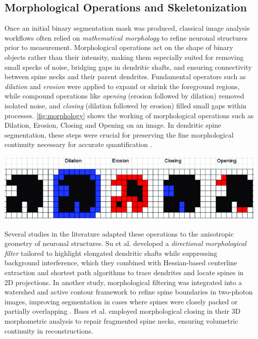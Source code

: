 \subsection{Morphological Operations and Skeletonization}
Once an initial binary segmentation mask was produced, classical image analysis workflows often relied on \textit{mathematical morphology} to refine neuronal structures prior to measurement. Morphological operations act on the shape of binary objects rather than their intensity, making them especially suited for removing small specks of noise, bridging gaps in dendritic shafts, and ensuring connectivity between spine necks and their parent dendrites. Fundamental operators such as \textit{dilation} and \textit{erosion} were applied to expand or shrink the foreground regions, while compound operations like \textit{opening} (erosion followed by dilation) removed isolated noise, and \textit{closing} (dilation followed by erosion) filled small gaps within processes. \autoref{fig:morphology} shows the working of morphological operations such as Dilation, Erosion, Closing and Opening on an image. In dendritic spine segmentation, these steps were crucial for preserving the fine morphological continuity necessary for accurate quantification \cite{Weaver_2004, Okabe_2020}.

\begin{center}
    \includegraphics[width=.9\textwidth]{figures/08_morphology.png} 
    \label{fig:morphology}
\end{center}

Several studies in the literature adapted these operations to the anisotropic geometry of neuronal structures. Su et al. \cite{Su_2014} developed a \textit{directional morphological filter} tailored to highlight elongated dendritic shafts while suppressing background interference, which they combined with Hessian-based centerline extraction and shortest path algorithms to trace dendrites and locate spines in 2D projections. In another study, morphological filtering was integrated into a watershed and active contour framework to refine spine boundaries in two-photon images, improving segmentation in cases where spines were closely packed or partially overlapping \cite{Erdil_2013}. Basu et al. \cite{Basu_2018} employed morphological closing in their 3D morphometric analysis to repair fragmented spine necks, ensuring volumetric continuity in reconstructions.

